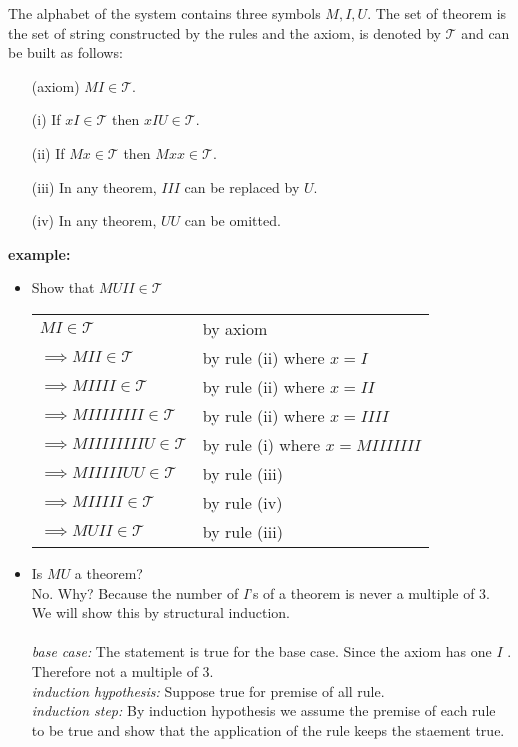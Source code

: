 \documentclass[12pt]{article}
\begin{document}
The alphabet of the system contains three symbols $M, I, U$.  The set of theorem is the set of string constructed by the rules and the axiom, is denoted by $\mathcal{T}$ and can be built as follows:
\begin{enumerate}
\item[(axiom)] $MI\in \mathcal{T}$.
\item[(i)] If $xI\in \mathcal{T}$ then $xIU\in \mathcal{T}$.
\item[(ii)] If $Mx \in \mathcal{T}$ then $Mxx\in \mathcal{T}$.
\item[(iii)] In any theorem, $III$ can be replaced by $U$.
\item[(iv)] In any theorem, $UU$ can be omitted.
\end{enumerate}
\textbf{example:}\\
\begin{itemize}
\item Show that $MUII \in \mathcal{T}$\\
\begin{tabular}{ll}
$MI\in \mathcal{T}$ & by axiom\\
$\implies MII\in \mathcal{T}$ & by rule (ii) where $x=I$\\
$\implies MIIII\in \mathcal{T}$ & by rule (ii) where $x=II$\\
$\implies MIIIIIIII\in \mathcal{T}$ & by rule (ii) where $x=IIII$\\
$\implies MIIIIIIIIU\in \mathcal{T}$ & by rule (i) where $x=MIIIIIII$\\
$\implies MIIIIIUU\in \mathcal{T}$ & by rule (iii)\\
$\implies MIIIII\in \mathcal{T}$ & by rule (iv)\\
$\implies MUII\in \mathcal{T}$ & by rule (iii)\\
\end{tabular}
\item Is $MU$ a theorem?\\
No. Why? Because the number of $I$'s of a theorem is never a multiple of 3.  We will show this by structural induction.\\\\
\textit{base case:}  The statement is true for the base case. Since the axiom has one $I$ .  Therefore not a multiple of 3.\\
\textit{induction hypothesis:}  Suppose true for premise of all rule.\\
\textit{induction step:}  By induction hypothesis we assume the premise of each rule to be true and show that the application of the rule keeps the staement true.\\

\end{itemize}
\end{document}
